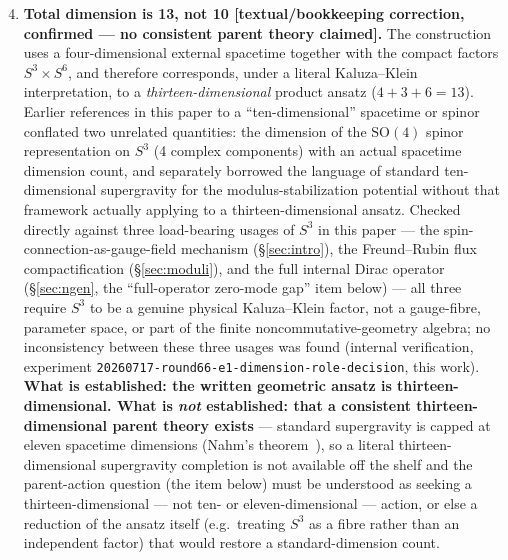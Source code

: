 \documentclass[12pt,a4paper]{article}
\begin{document}
\begin{enumerate}
\setcounter{enumi}{3}
\item \textbf{Total dimension is 13, not 10 [textual/bookkeeping correction, confirmed
  --- no consistent parent theory claimed].} The construction uses a four-dimensional
  external spacetime together with the compact factors $S^3\times S^6$, and therefore
  corresponds, under a literal Kaluza--Klein interpretation, to a
  \emph{thirteen-dimensional} product ansatz ($4+3+6=13$). Earlier references in this
  paper to a ``ten-dimensional'' spacetime or spinor conflated two unrelated
  quantities: the dimension of the $\mathrm{SO}(4)$ spinor representation on $S^3$ (4
  complex components) with an actual spacetime dimension count, and separately borrowed
  the language of standard ten-dimensional supergravity for the modulus-stabilization
  potential without that framework actually applying to a thirteen-dimensional ansatz.
  Checked directly against three load-bearing usages of $S^3$ in this paper --- the
  spin-connection-as-gauge-field mechanism (\S\ref{sec:intro}), the Freund--Rubin flux
  compactification (\S\ref{sec:moduli}), and the full internal Dirac operator
  (\S\ref{sec:ngen}, the ``full-operator zero-mode gap'' item below) --- all three
  require $S^3$ to be a genuine physical Kaluza--Klein factor, not a gauge-fibre,
  parameter space, or part of the finite noncommutative-geometry algebra; no
  inconsistency between these three usages was found (internal verification, experiment
  \texttt{20260717-round66-e1-dimension-role-decision}, this work). \textbf{What is
  established: the written geometric ansatz is thirteen-dimensional. What is
  \emph{not} established: that a consistent thirteen-dimensional parent theory exists}
  --- standard supergravity is capped at eleven spacetime dimensions
  (Nahm's theorem~\cite{Nahm1978}), so a literal thirteen-dimensional supergravity
  completion is not available off the shelf and the parent-action question (the item
  below) must be understood as seeking a thirteen-dimensional --- not ten- or
  eleven-dimensional --- action, or else a reduction of the ansatz itself (e.g.\ treating
  $S^3$ as a fibre rather than an independent factor) that would restore a
  standard-dimension count.


\end{enumerate}
\end{document}
